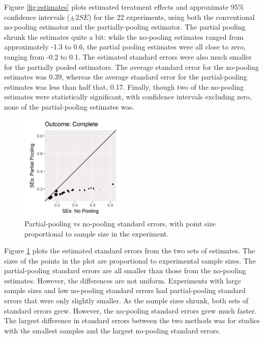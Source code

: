 \documentclass{edm_template}
\begin{document}
Figure \ref{fig:estimates} plots estimated treatment effects and approximate 95\% confidence intervals ($\pm 2SE$) for the 22 experiments, using both the conventional no-pooling estimator and the partially-pooling estimator. 
The partial pooling shrunk the estimates quite a bit: while the no-pooling estimates ranged from approximately -1.3 to 0.6, the partial pooling estimates were all close to zero, ranging from -0.2 to  0.1. 
The estimated standard errors were also much smaller for the partially pooled estimators.
The average standard error for the no-pooling estimates was 0.39, whereas the average standard error for the partial-pooling estimates was less than half that, 0.17.
Finally, though two of the no-pooling estimates were statistically significant, with confidence intervals excluding zero, none of the partial-pooling estimates was. 


\begin{figure}
\centering
\includegraphics[width=0.45\textwidth]{completeSE1.jpg}
\caption{Partial-pooling vs no-pooling standard errors, with point size proportional to sample size in the experiment.}
\label{fig:ses}
\end{figure}

Figure \ref{fig:ses} plots the estimated standard errors from the two sets of estimates. 
The sizes of the points in the plot are proportional to experimental sample sizes.
The partial-pooling standard errors are all smaller than those from the no-pooling estimates.
However, the differences are not uniform. 
Experiments with large sample sizes and low no-pooling standard errors had partial-pooling standard errors that were only slightly smaller. 
As the sample sizes shrunk, both sets of standard errors grew.
However, the no-pooling standard errors grew much faster. The largest difference in standard errors between the two methods was for studies with the smallest samples and the largest no-pooling standard errors. 
\end{document}
